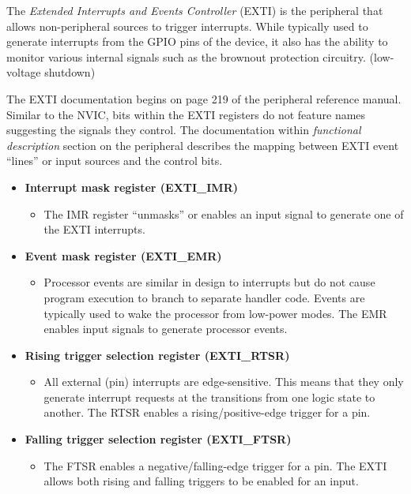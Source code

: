 \documentclass[11pt,fleqn]{book} %
\begin{document}
The \textit{Extended Interrupts and Events Controller} (EXTI) is the peripheral that allows non-peripheral sources to trigger interrupts. While typically used to generate interrupts from the GPIO pins of the device, it also has the ability to monitor various internal signals such as the brownout protection circuitry. (low-voltage shutdown)

The EXTI documentation begins on page 219 of the peripheral reference manual. Similar to the NVIC,  bits within the EXTI registers do not feature names suggesting the signals they control. The documentation within \textit{functional description} section on the peripheral describes the mapping between EXTI event ``lines'' or input sources and the control bits.  

\begin{itemize}
    \item \textbf{Interrupt mask register (EXTI\_IMR)}
    \begin{itemize}
        \item The IMR register ``unmasks'' or enables an input signal to generate one of the EXTI interrupts.
    \end{itemize}
    \item \textbf{Event mask register (EXTI\_EMR)}
    \begin{itemize}
        \item Processor events are similar in design to interrupts but do not cause program execution to branch to separate handler code. Events are typically used to wake the processor from low-power modes. The EMR enables input signals to generate processor events. 
    \end{itemize}
    \item \textbf{Rising trigger selection register (EXTI\_RTSR)}
    \begin{itemize}
        \item All external (pin) interrupts are edge-sensitive. This means that they only generate interrupt requests at the transitions from one logic state to another. The RTSR enables a rising/positive-edge trigger for a pin.
    \end{itemize}
    \item \textbf{Falling trigger selection register (EXTI\_FTSR)}
    \begin{itemize}
        \item The FTSR enables a negative/falling-edge trigger for a pin. The EXTI allows both rising and falling triggers to be enabled for an input.  
    \end{itemize}

\end{itemize}
\end{document}
